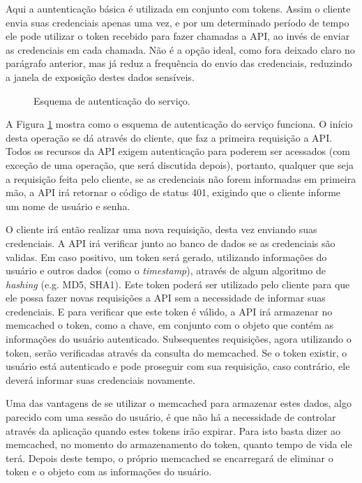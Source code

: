 \documentclass[diss]{template/setrem}
\begin{document}
Aqui a auntenticação básica é utilizada em conjunto com tokens. Assim o cliente envia suas credenciais apenas uma vez, e por um determinado período de tempo ele pode utilizar o token recebido para fazer chamadas a API, ao invés de enviar as credenciais em cada chamada. Não é a opção ideal, como fora deixado claro no parágrafo anterior, mas já reduz a frequência do envio das credenciais, reduzindo a janela de exposição destes dados sensíveis.

\begin{figure}[!h]

    \caption{Esquema de autenticação do serviço.}
    \label{fig:auth-scheme}
\end{figure}

A Figura \ref{fig:auth-scheme} mostra como o esquema de autenticação do serviço funciona. O início desta operação se dá através do cliente, que faz a primeira requisição a API. Todos os recursos da API exigem autenticação para poderem ser acessados (com exceção de uma operação, que será discutida depois), portanto, qualquer que seja a requisição feita pelo cliente, se as credenciais não forem informadas em primeira mão, a API irá retornar o código de status 401, exigindo que o cliente informe um nome de usuário e senha.

O cliente irá então realizar uma nova requisição, desta vez enviando suas credenciais. A API irá verificar junto ao banco de dados se as credenciais são validas. Em caso positivo, um token será gerado, utilizando informações do usuário e outros dados (como o \emph{timestamp}), através de algum algoritmo de \emph{hashing} (e.g. MD5, SHA1). Este token poderá ser utilizado pelo cliente para que ele possa fazer novas requisições a API sem a necessidade de informar suas credenciais. E para verificar que este token é válido, a API irá armazenar no memcached o token, como a chave, em conjunto com o objeto que contém as informações do usuário autenticado. Subsequentes requisições, agora utilizando o token, serão verificadas através da consulta do memcached. Se o token existir, o usuário está autenticado e pode proseguir com sua requisição, caso contrário, ele deverá informar suas credenciais novamente.

Uma das vantagens de se utilizar o memcached para armazenar estes dados, algo parecido com uma sessão do usuário, é que não há a necessidade de controlar através da aplicação quando estes tokens irão expirar. Para isto basta dizer ao memcached, no momento do armazenamento do token, quanto tempo de vida ele terá. Depois deste tempo, o próprio memcached se encarregará de eliminar o token e o objeto com as informações do usuário.
\end{document}
